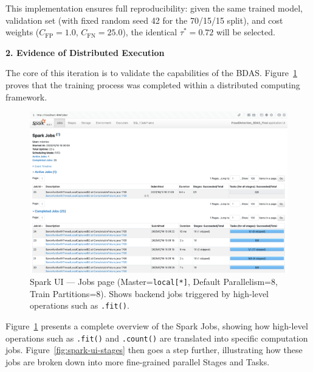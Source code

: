 \documentclass[sigplan,screen]{acmart}
\begin{document}
This implementation ensures full reproducibility: given the same trained model, validation set (with fixed random seed 42 for the 70/15/15 split), and cost weights ($C_{\text{FP}}=1.0$, $C_{\text{FN}}=25.0$), the identical $\tau^* = 0.72$ will be selected.

\textbf{2. Evidence of Distributed Execution}

The core of this iteration is to validate the capabilities of the BDAS. Figure~\ref{fig:spark-ui-jobs} proves that the training process was completed within a distributed computing framework.

\begin{figure}[h]
  \centering
  \includegraphics[width=\textwidth]{Figure/7.2b.png}
  \caption{Spark UI --- Jobs page (Master=\texttt{local[*]}, Default Parallelism=8, Train Partitions=8). Shows backend jobs triggered by high-level operations such as \texttt{.fit()}.}
  \label{fig:spark-ui-jobs}
\end{figure}

Figure~\ref{fig:spark-ui-jobs} presents a complete overview of the Spark Jobs, showing how high-level operations such as \texttt{.fit()} and \texttt{.count()} are translated into specific computation jobs. Figure~\ref{fig:spark-ui-stages} then goes a step further, illustrating how these jobs are broken down into more fine-grained parallel Stages and Tasks.
\end{document}
